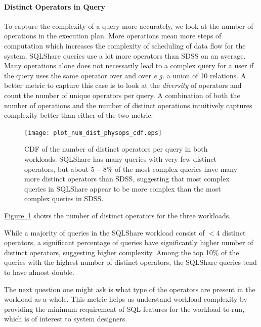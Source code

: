 \documentclass{sig-alternate}
\newcommand{\note}[2]{{\color{#1} {#2}}}
\newcommand{\reviewthree}[1]{\note{black}{#1}}
\newcommand{\eg}{{\em e.g.}\xspace}
\newcommand{\figref}[1]{\hyperref[#1]{Figure~\ref*{#1}}}
\newcommand{\sqlshare}{SQLShare}
\begin{document}
\paragraph*{Distinct Operators in Query}

To capture the complexity of a query more accurately, we look at the number of operations in the execution plan.
More operations mean more steps of computation which increases the complexity of scheduling of data flow for the system. 
\sqlshare{} queries use a lot more operators than SDSS on an average.
Many operations alone does not necessarily lead to a complex query for a user if the query uses the same operator over and over \eg a union of 10 relations.
A better metric to capture this case is to look at the \emph{diversity} of operators and count the number of unique operators per query.
A combination of both the number of operations and the number of distinct operations intuitively captures complexity better than either of the two metric.
\begin{figure}[h]
\centering
\vspace{-1pt}
\texttt{[image: plot\_num\_dist\_physops\_cdf.eps]}
\caption{CDF of the number of distinct operators per query in both workloads. \sqlshare{} has many queries with very few distinct operators, but about $5-8\%$ of the most complex queries have many more distinct operators than SDSS, \reviewthree{suggesting that most complex queries in \sqlshare{} appear to be more complex than the most complex queries in SDSS.}}
\label{fig:distopscdf}
\vspace{-8pt}
\end{figure}
\figref{fig:distopscdf} shows the number of distinct operators for the three workloads. 

While a majority of queries in the \sqlshare{} workload consist of $<4$ distinct operators, a significant percentage of queries have significantly higher number of distinct operators, suggesting higher complexity.  Among the top 10\% of the queries with the highest number of distinct operators, the \sqlshare{} queries tend to have almost double.

The next question one might ask is what type of the operators are present in the workload as a whole.
This metric helps us understand workload complexity by providing the minimum requirement of SQL features for the workload to run, which is of interest to system designers.
\end{document}
